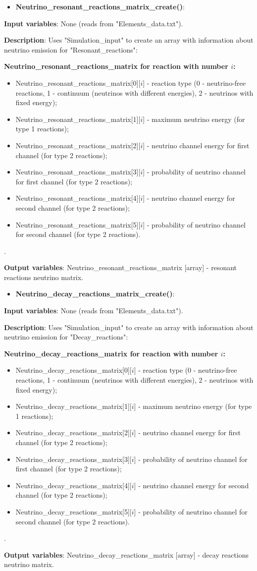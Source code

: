 \documentclass[a4paper,12pt]{article}
\newcommand{\namefunction}[4]{
  \begin{itemize}
    \item \textbf{#1}:
  \end{itemize}
  
  \textbf{Input variables}: #2.
  
  \textbf{Description}: #3.
  
  \textbf{Output variables}: #4.
}
\begin{document}
\namefunction{Neutrino\_resonant\_reactions\_matrix\_create()}{None (reads from "Elements\_data.txt")}{Uses "Simulation\_input" to create an array with information about neutrino emission for "Resonant\_reactions":

\textbf{Neutrino\_resonant\_reactions\_matrix for reaction with number $i$:}
\begin{itemize}
    \item Neutrino\_resonant\_reactions\_matrix[0][$i$] - reaction type (0 - neutrino-free reactions, 1 - continuum (neutrinos with different energies), 2 - neutrinos with fixed energy);
    \item Neutrino\_resonant\_reactions\_matrix[1][$i$] - maximum neutrino energy (for type 1 reactions);
    \item Neutrino\_resonant\_reactions\_matrix[2][$i$] - neutrino channel energy for first channel (for type 2 reactions);
    \item Neutrino\_resonant\_reactions\_matrix[3][$i$] - probability of neutrino channel for first channel (for type 2 reactions);
    \item Neutrino\_resonant\_reactions\_matrix[4][$i$] - neutrino channel energy for second channel (for type 2 reactions);
    \item Neutrino\_resonant\_reactions\_matrix[5][$i$] - probability of neutrino channel for second channel (for type 2 reactions).
\end{itemize}

}{Neutrino\_resonant\_reactions\_matrix [array] - resonant reactions neutrino matrix}

\vspace{1em}

\namefunction{Neutrino\_decay\_reactions\_matrix\_create()}{None (reads from "Elements\_data.txt")}{Uses "Simulation\_input" to create an array with information about neutrino emission for "Decay\_reactions":

\textbf{Neutrino\_decay\_reactions\_matrix for reaction with number $i$:}
\begin{itemize}
    \item Neutrino\_decay\_reactions\_matrix[0][$i$] - reaction type (0 - neutrino-free reactions, 1 - continuum (neutrinos with different energies), 2 - neutrinos with fixed energy);
    \item Neutrino\_decay\_reactions\_matrix[1][$i$] - maximum neutrino energy (for type 1 reactions);
    \item Neutrino\_decay\_reactions\_matrix[2][$i$] - neutrino channel energy for first channel (for type 2 reactions);
    \item Neutrino\_decay\_reactions\_matrix[3][$i$] - probability of neutrino channel for first channel (for type 2 reactions);
    \item Neutrino\_decay\_reactions\_matrix[4][$i$] - neutrino channel energy for second channel (for type 2 reactions);
    \item Neutrino\_decay\_reactions\_matrix[5][$i$] - probability of neutrino channel for second channel (for type 2 reactions).
\end{itemize}

}{Neutrino\_decay\_reactions\_matrix [array] - decay reactions neutrino matrix}
\end{document}
